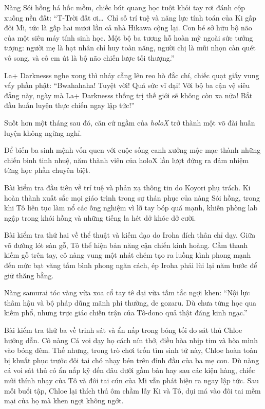 \documentclass[../main.tex]{subfiles}
\begin{document}
Nàng Sói hồng há hốc mồm, chiếc bút quang học tuột khỏi tay rơi đánh cộp xuống nền đất: ``T-Trời đất ơi\dots\ Chỉ số trí tuệ và năng lực tính toán của Ki gấp đôi Mi, tức là gấp hai mươi lần cả nhà Hikawa cộng lại. Con bé sở hữu bộ não của một siêu máy tính sinh học. Một bộ ba tương hỗ hoàn mỹ ngoài sức tưởng tượng: người mẹ là hạt nhân chỉ huy toàn năng, người chị là mũi nhọn càn quét vô song, và cô em út là bộ não chiến lược tối thượng.''

La+ Darknesss nghe xong thì nhảy cẫng lên reo hò đắc chí, chiếc quạt giấy vung vẩy phần phật: ``Bwahahaha! Tuyệt vời! Quá sức vĩ đại! Với bộ ba cận vệ siêu đẳng này, ngày mà La+ Darknesss thống trị thế giới sẽ không còn xa nữa! Bắt đầu huấn luyện thực chiến ngay lập tức!''

\ct

Suốt hơn một tháng sau đó, căn cứ ngầm của \textit{holoX} trở thành một võ đài huấn luyện không ngừng nghỉ.

Để biến ba sinh mệnh vốn quen với cuộc sống canh xưởng mộc mạc thành những chiến binh tinh nhuệ, năm thành viên của holoX lần lượt đứng ra đảm nhiệm từng học phần chuyên biệt.

Bài kiểm tra đầu tiên về trí tuệ và phản xạ thông tin do Koyori phụ trách. Ki hoàn thành xuất sắc mọi giáo trình trong sự thán phục của nàng Sói hồng, trong khi Tô liên tục làm nổ các ống nghiệm vì lỡ tay bóp quá mạnh, khiến phòng lab ngập trong khói hồng và những tiếng la hét dở khóc dở cười.

Bài kiểm tra thứ hai về thể thuật và kiếm đạo do Iroha đích thân chỉ dạy. Giữa võ đường lót sàn gỗ, Tô thể hiện bản năng cận chiến kinh hoàng. Cầm thanh kiếm gỗ trên tay, cô nàng vung một nhát chém tạo ra luồng kình phong mạnh đến mức bạt văng tấm bình phong ngăn cách, ép Iroha phải lùi lại năm bước để giữ thăng bằng.

Nàng samurai tóc vàng vừa xoa cổ tay tê dại vừa tấm tắc ngợi khen: ``Nội lực thâm hậu và bộ pháp dũng mãnh phi thường, de gozaru. Dù chưa từng học qua kiếm phổ, nhưng trực giác chiến trận của Tô-dono quả thật đáng kinh ngạc.''

Bài kiểm tra thứ ba về trinh sát và ẩn nấp trong bóng tối do sát thủ Chloe hướng dẫn. Cô nàng Cá voi dạy họ cách nín thở, điều hòa nhịp tim và hòa mình vào bóng đêm. Thế nhưng, trong trò chơi trốn tìm sinh tử này, Chloe hoàn toàn bị khuất phục trước đôi tai chó nhạy bén trên đỉnh đầu của ba mẹ con. Dù nàng cá voi sát thủ có ẩn nấp kỹ đến đâu dưới gầm bàn hay sau các kiện hàng, chiếc mũi thính nhạy của Tô và đôi tai cún của Mi vẫn phát hiện ra ngay lập tức. Sau mỗi buổi tập, Chloe lại thích thú ôm chầm lấy Ki và Tô, dụi má vào đôi tai mềm mại của họ mà khen ngợi không ngớt.
\end{document}
